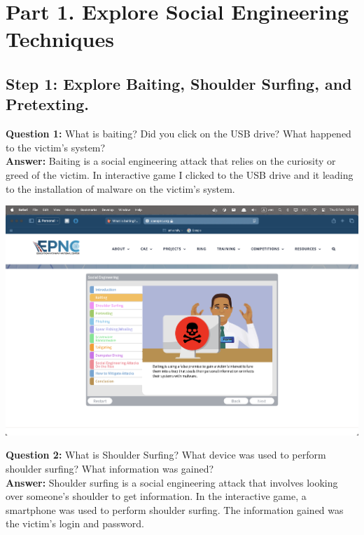 \documentclass{article}
\begin{document}
\section*{Part 1. Explore Social Engineering Techniques}


\subsection*{Step 1: Explore Baiting, Shoulder Surfing, and Pretexting.}

\textbf{Question 1: } What is baiting? Did you click on the USB drive? What happened to the victim's system? \\
\textbf{Answer: } Baiting is a social engineering attack that relies on the curiosity or greed of the victim. In interactive game I clicked to the USB drive and it leading to the installation of malware on the victim's system. \\

\vspace{1\baselineskip}

\includegraphics[width=1\textwidth]{1.png}

\newpage

\textbf{Question 2: } What is Shoulder Surfing? What device was used to perform shoulder surfing? What information was gained? \\
\textbf{Answer: } Shoulder surfing is a social engineering attack that involves looking over someone's shoulder to get information. In the interactive game, a smartphone was used to perform shoulder surfing. The information gained was the victim's login and password. \\

\vspace{1\baselineskip}
\end{document}
